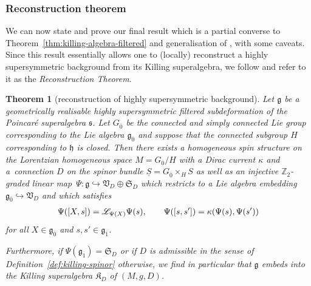 \documentclass[11pt]{article}
\numberwithin{equation}{section}
\numberwithin{equation}{section}
\newtheorem{Theorem}{Theorem}[section]
\newcommand{\fg}{\mathfrak{g}}
\newcommand{\fh}{\mathfrak{h}}
\newcommand{\fs}{\mathfrak{s}}
\newcommand{\fK}{\mathfrak{K}}
\newcommand{\fS}{\mathfrak{S}}
\newcommand{\fV}{\mathfrak{V}}
\newcommand{\ZZ}{\mathbb{Z}}
\newcommand{\eL}{\mathscr{L}}
\newcommand{\Sbundle}{\underline{S}}
\newcommand{\1}{\mathbbm{1}}
\begin{document}
\subsubsection{Reconstruction theorem}

We can now state and prove our final result which is a partial converse to Theorem~\ref{thm:killing-algebra-filtered} and generalisation of \cite[Theorem~13]{Figueroa-OFarrill2017_1}, with some caveats. Since this result essentially allows one to (locally) reconstruct a highly supersymmetric background from its Killing superalgebra, we follow \cite{Figueroa-OFarrill2017_1,Santi2022} and refer to it as the \emph{Reconstruction Theorem}.

\begin{Theorem}[reconstruction of highly supersymmetric background]\label{thm:homog-spin-mfld}	
	Let $\fg$ be a geometrically realisable highly supersymmetric filtered subdeformation of the Poincar\'e superalgebra $\fs$.
	Let $G_{\overline0}$ be the connected and simply connected Lie group corresponding to the Lie algebra $\fg_{\overline0}$ and suppose that the connected subgroup $H$ corresponding to $\fh$ is closed.
	Then there exists a homogeneous spin structure on the Lorentzian homogeneous space $M=G_{\overline0}/H$ with a Dirac current $\kappa$ and a~connection $D$ on the spinor bundle $\Sbundle=G_{\overline 0}\times_H S$ as well as an injective $\ZZ_2$-graded linear map~${\Psi\colon\fg\hookrightarrow\fV_D\oplus\fS_D}$ which restricts to a Lie algebra embedding $\fg_{\overline 0}\hookrightarrow\fV_D$ and which satisfies
	\begin{align}\label{eq:reconstruct-brackets}
		\Psi(\comm{X}{s}) = \eL_{\Psi(X)}\Psi(s),
		\qquad \Psi\qty(\comm{s}{s'}) = \kappa\qty(\Psi(s),\Psi(s'))
	\end{align}
	for all $X\in\fg_{\overline 0}$ and $s,s'\in \fg_{\overline 1}$.
	
	Furthermore, if $\Psi(\fg_{\overline 1})=\fS_D$ or if $D$ is admissible in the sense of Definition~{\rm\ref{def:killing-spinor}} otherwise, we find in particular that $\fg$ embeds into the Killing superalgebra $\fK_D$ of $(M,g,D)$.
\end{Theorem}
\end{document}
